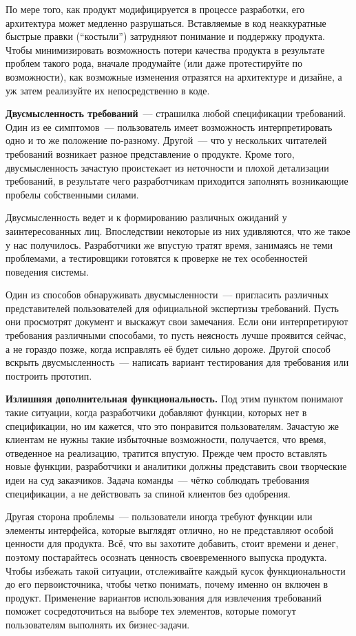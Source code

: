 \documentclass{../../text-style}
\begin{document}
По мере того, как продукт модифицируется в процессе разработки, его архитектура может медленно разрушаться.
Вставляемые в код неаккуратные быстрые правки (\enquote{костыли}) затрудняют понимание и поддержку продукта.
Чтобы минимизировать возможность потери качества продукта в результате проблем такого рода, вначале продумайте (или даже протестируйте по возможности), как возможные изменения отразятся на архитектуре и дизайне, а уж затем реализуйте их непосредственно в коде.

\textbf{Двусмысленность требований}~--- страшилка любой спецификации требований.
Один из ее симптомов~--- пользователь имеет возможность интерпретировать одно и то же положение по-разному.
Другой~--- что у нескольких читателей требований возникает разное представление о продукте.
Кроме того, двусмысленность зачастую проистекает из неточности и плохой детализации требований, в результате чего разработчикам приходится заполнять возникающие пробелы собственными силами.

Двусмысленность ведет и к формированию различных ожиданий у заинтересованных лиц.
Впоследствии некоторые из них удивляются, что же такое у нас получилось.
Разработчики же впустую тратят время, занимаясь не теми проблемами, а тестировщики готовятся к проверке не тех особенностей поведения системы.

Один из способов обнаруживать двусмысленности~--- пригласить различных представителей пользователей для официальной экспертизы требований.
Пусть они просмотрят документ и выскажут свои замечания.
Если они интерпретируют требования различными способами, то пусть неясность лучше проявится сейчас, а не гораздо позже, когда исправлять её будет сильно дороже.
Другой способ вскрыть двусмысленность~--- написать вариант тестирования для требования или построить прототип.

\textbf{Излишняя дополнительная функциональность.}
Под этим пунктом понимают такие ситуации, когда разработчики добавляют функции, которых нет в спецификации, но им кажется, что это понравится пользователям.
Зачастую же клиентам не нужны такие избыточные возможности, получается, что время, отведенное на реализацию, тратится впустую.
Прежде чем просто вставлять новые функции, разработчики и аналитики должны представить свои творческие идеи на суд заказчиков.
Задача команды~--- чётко соблюдать требования спецификации, а не действовать за спиной клиентов без одобрения.

Другая сторона проблемы~--- пользователи иногда требуют функции или элементы интерфейса, которые выглядят отлично, но не представляют особой ценности для продукта.
Всё, что вы захотите добавить, стоит времени и денег, поэтому постарайтесь осознать ценность своевременного выпуска продукта.
Чтобы избежать такой ситуации, отслеживайте каждый кусок функциональности до его первоисточника, чтобы четко понимать, почему именно он включен в продукт.
Применение вариантов использования для извлечения требований поможет сосредоточиться на выборе тех элементов, которые помогут пользователям выполнять их бизнес-задачи.
\end{document}
